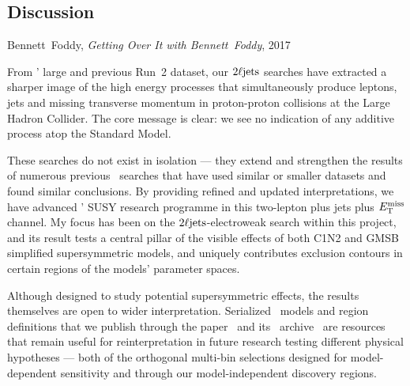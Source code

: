 \begin{singlespacing}
\section{Discussion}
\label{sec:2ljets_discussion}
\begin{epigraphs}
%
{Bennett~Foddy,
\emph{Getting Over It with Bennett~Foddy},
2017~\cite{foddy2017getting}}
\end{epigraphs}
\end{singlespacing}

From \atlas' large and previous Run~2 dataset, our $2\ell\mathrm{jets}$ searches
have extracted a sharper image of the high energy processes that simultaneously
produce leptons, jets and missing transverse momentum in proton-proton
collisions at the Large Hadron Collider.
The core message is clear: we see no indication of any additive process
atop the Standard Model.

These searches do not exist in isolation --- they extend and strengthen the
results of numerous previous \atlas\ searches that have used similar or smaller
datasets and found similar conclusions.
By providing refined and updated interpretations, we have advanced \atlas' SUSY
research programme in this two-lepton plus jets plus $E_\mathrm{T}^\mathrm{miss}$ channel.
My focus has been on the $2\ell\mathrm{jets}$-electroweak search within this project,
and its result tests a central pillar of the visible effects of both C1N2 and
GMSB simplified supersymmetric models, and uniquely contributes exclusion
contours in certain regions of the models' parameter spaces.

Although designed to study potential supersymmetric effects, the results
themselves are open to wider interpretation.
Serialized \heplikelihood\ models and region definitions that we publish
through the paper~\cite{atlas2022searches} and its \hepdata\
archive~\cite{hepdata.116034} are resources that remain useful for
reinterpretation in future research testing different physical hypotheses
--- both of the orthogonal multi-bin selections designed for model-dependent
sensitivity and through our model-independent discovery regions.

